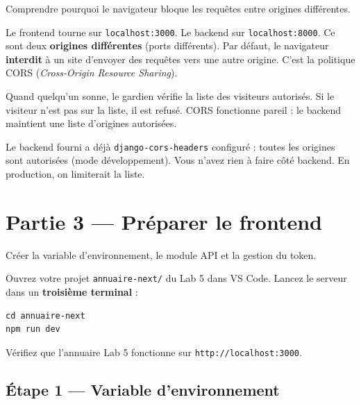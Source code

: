 \documentclass[11pt,a4paper]{article}
\begin{document}
\begin{objectifbox}
Comprendre pourquoi le navigateur bloque les requêtes entre origines différentes.
\end{objectifbox}

Le frontend tourne sur \texttt{localhost:3000}. Le backend sur \texttt{localhost:8000}. Ce sont deux \textbf{origines différentes} (ports différents). Par défaut, le navigateur \textbf{interdit} à un site d'envoyer des requêtes vers une autre origine. C'est la politique CORS (\emph{Cross-Origin Resource Sharing}).

\begin{infobox}
Quand quelqu'un sonne, le gardien vérifie la liste des visiteurs autorisés. Si le visiteur n'est pas sur la liste, il est refusé. CORS fonctionne pareil : le backend maintient une liste d'origines autorisées.
\end{infobox}

Le backend fourni a déjà \texttt{django-cors-headers} configuré : toutes les origines sont autorisées (mode développement). Vous n'avez rien à faire côté backend. En production, on limiterait la liste.

\section{Partie 3 --- Préparer le frontend}

\begin{objectifbox}
Créer la variable d'environnement, le module API et la gestion du token.
\end{objectifbox}

Ouvrez votre projet \texttt{annuaire-next/} du Lab 5 dans VS Code. Lancez le serveur dans un \textbf{troisième terminal} :

\begin{lstlisting}[style=terminal]
cd annuaire-next
npm run dev
\end{lstlisting}

Vérifiez que l'annuaire Lab 5 fonctionne sur \texttt{http://localhost:3000}.

\subsection{Étape 1 --- Variable d'environnement}
\end{document}
